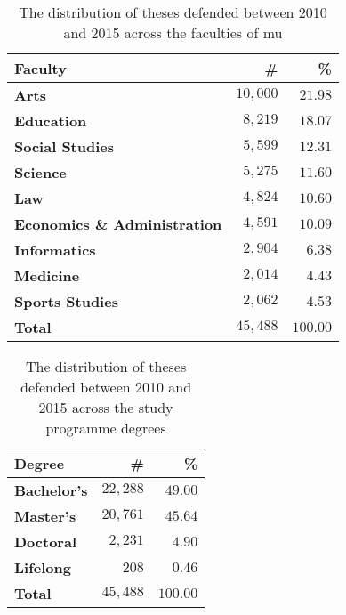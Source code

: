   \begin{table}
    \begin{tabularx}{\textwidth}{Xrr}
      \textbf{Faculty} & \textbf{\#} & \textbf{\%} \\
      \hline
      \textbf{Arts}                         & $10{,}000$ & $21.98$ \\%
      \textbf{Education}                    & $8{,}219$  & $18.07$ \\%
      \textbf{Social Studies}               & $5{,}599$  & $12.31$ \\%
      \textbf{Science}                      & $5{,}275$  & $11.60$ \\%
      \textbf{Law}                          & $4{,}824$  & $10.60$ \\%
      \textbf{Economics \& Administration}  & $4{,}591$  & $10.09$ \\%
      \textbf{Informatics}                  & $2{,}904$  &  $6.38$ \\%
      \textbf{Medicine}                     & $2{,}014$  &  $4.43$ \\%
      \textbf{Sports Studies}               & $2{,}062$  &  $4.53$ \\%
      \hline
      \textbf{Total}                        & \textbf{$45{,}488$} & \textbf{$100.00$}
    \end{tabularx}
    \caption{The distribution of theses defended between 2010 and 2015 across the faculties of \gls{mu}}
    \label{table:statistics-faculty}
  \end{table}

  \begin{table}
    \begin{tabularx}{\textwidth}{Xrr}
      \textbf{Degree} & \textbf{\#} & \textbf{\%} \\
      \hline
      \textbf{Bachelor's} & $22{,}288$ & $49.00$ \\
      \textbf{Master's}   & $20{,}761$ & $45.64$ \\
      \textbf{Doctoral}   &  $2{,}231$ &  $4.90$ \\
      \textbf{Lifelong}   &      $208$ &  $0.46$ \\
      \hline
      \textbf{Total}      & \textbf{$45{,}488$} & \textbf{$100.00$}
    \end{tabularx}
    \caption{The distribution of theses defended between 2010 and 2015 across the study programme degrees}
    \label{table:statistics-degree}
  \end{table}
  
